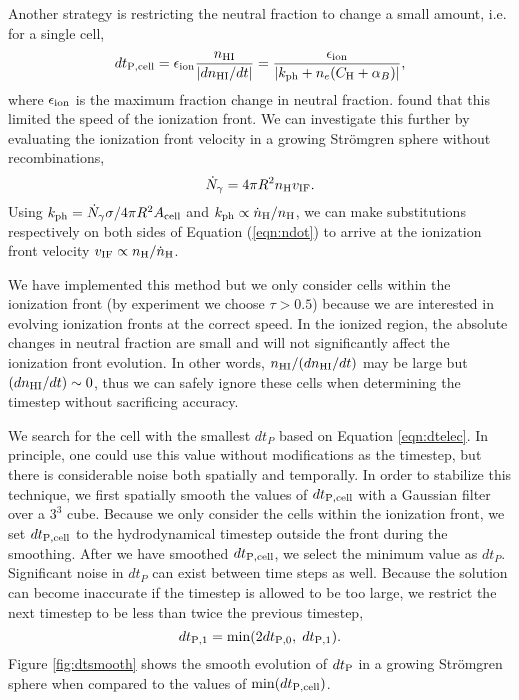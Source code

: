 \documentclass[useAMS,usenatbib,a4paper]{mn2e}
\begin{document}
Another strategy is restricting the neutral fraction to change a small
amount, i.e. for a single cell,
%
\begin{equation}
  \label{eqn:dtelec}
  dt_{\rm P,cell} = \epsilon_{\rm ion} \frac{n_{\rm HI}}{|dn_{\rm HI}/dt|} =
  \frac{\epsilon_{\rm ion}}{|k_{\rm ph} + n_e (C_{\rm H} + \alpha_B)|},
\end{equation}
where $\epsilon_{\rm ion}$ is the maximum fraction change in neutral
fraction.  \citet{Shapiro04} found that this limited the speed of the
ionization front.  We can investigate this further by evaluating the
ionization front velocity in a growing Str\"{o}mgren sphere without
recombinations, 
\begin{equation}
  \label{eqn:ndot}
  \dot{N}_\gamma = 4 \pi R^2 n_{\rm H} v_{\rm IF}.
\end{equation}
Using $\kph = \dot{N}_\gamma \sigma / 4\pi R^2 A_{\rm cell}$ and $\kph
\propto \dot{n}_{\rm H} / n_{\rm H}$, we can make substitutions
respectively on both sides of Equation (\ref{eqn:ndot}) to arrive at
the ionization front velocity $v_{\rm IF} \propto n_{\rm H}
/\dot{n}_{\rm H}$.

We have implemented this method but we only consider cells within the
ionization front (by experiment we choose $\tau > 0.5$) because we are
interested in evolving ionization fronts at the correct speed.  In the
ionized region, the absolute changes in neutral fraction are small and
will not significantly affect the ionization front evolution.  In
other words, $n_{\rm HI}/(dn_{\rm HI}/dt)$ may be large but $(dn_{\rm
  HI}/dt) \sim 0$, thus we can safely ignore these cells when
determining the timestep without sacrificing accuracy.

We search for the cell with the smallest $dt_P$ based on Equation
\ref{eqn:dtelec}.  In principle, one could use this value without
modifications as the timestep, but there is considerable noise both
spatially and temporally.  In order to stabilize this technique, we
first spatially smooth the values of $dt_{\rm P,cell}$ with a Gaussian
filter over a $3^3$ cube.  Because we only consider the cells within
the ionization front, we set $dt_{\rm P,cell}$ to the hydrodynamical
timestep outside the front during the smoothing.  After we have
smoothed $dt_{\rm P,cell}$, we select the minimum value as $dt_P$.
Significant noise in $dt_P$ can exist between time steps as well.
Because the solution can become inaccurate if the timestep is allowed
to be too large, we restrict the next timestep to be less than twice
the previous timestep,
%
\begin{equation}
  \label{eqn:dtchange}
  dt_{\rm P,1} = \min(2 dt_{\rm P,0},\; dt_{\rm P,1}).
\end{equation}
Figure \ref{fig:dtsmooth} shows the smooth evolution of $dt_{\rm P}$
in a growing Str\"{o}mgren sphere when compared to the values of
$\min(dt_{\rm P,cell})$.
\end{document}
